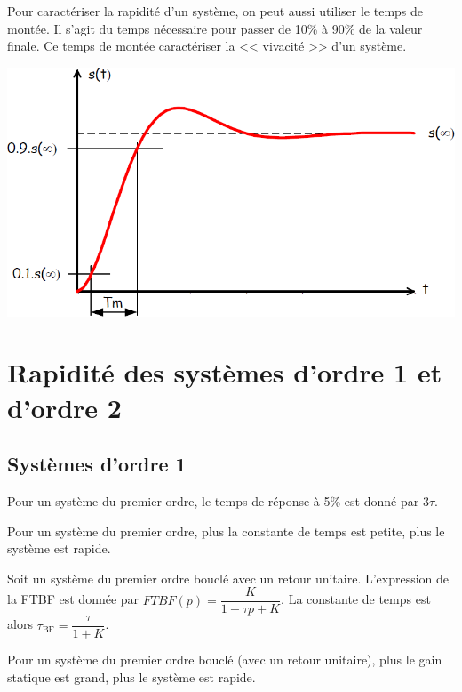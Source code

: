 \documentclass[10pt,fleqn]{article} %
\begin{document}
\begin{minipage}[c]{.48\linewidth}
Pour caractériser la rapidité d'un système, on peut aussi utiliser le temps de montée. Il s'agit du temps nécessaire pour passer de 10\% à 90\% de la valeur finale. Ce temps de montée caractériser la << vivacité >> d'un système. 
\end{minipage} \hfill
\begin{minipage}[c]{.4\linewidth}
\begin{center}
%
\includegraphics[width=\linewidth]{images/tm}
\end{center}
\end{minipage} 
\section{Rapidité des systèmes d'ordre 1 et d'ordre 2}
\subsection{Systèmes d'ordre 1}
Pour un système du premier ordre, le temps de réponse à 5\% est donné par $3\tau$.
\begin{resultat}
Pour un système du premier ordre, plus la constante de temps est petite, plus le système est rapide.
\end{resultat}

Soit un système du premier ordre bouclé avec un retour unitaire. L'expression de la FTBF est donnée par $FTBF(p)=\dfrac{K}{1+\tau p + K}$. La constante de temps est alors $\tau_{\text{BF}}=\dfrac{\tau}{1+K}$. 

\begin{resultat}
Pour un système du premier ordre bouclé (avec un retour unitaire), plus le gain statique est grand, plus le système est rapide. 
\end{resultat}
\end{document}
